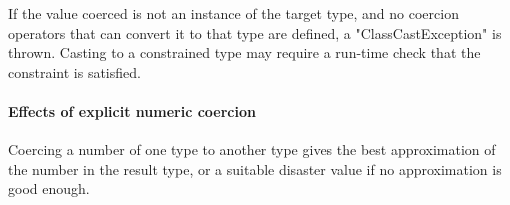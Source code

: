If the value coerced is not an instance of the target type,
and no coercion operators that can convert it to that type are defined, 
a \xcd"ClassCastException" is thrown.  Casting to a constrained
type may require a run-time check that the constraint is
satisfied.




\paragraph{Effects of explicit numeric coercion}
\label{sec:effects-of-explicit-numeric-coercions}

Coercing a number of one type to another type gives the best approximation of
the number in the result type, or a suitable disaster value if no
approximation is good enough.  

